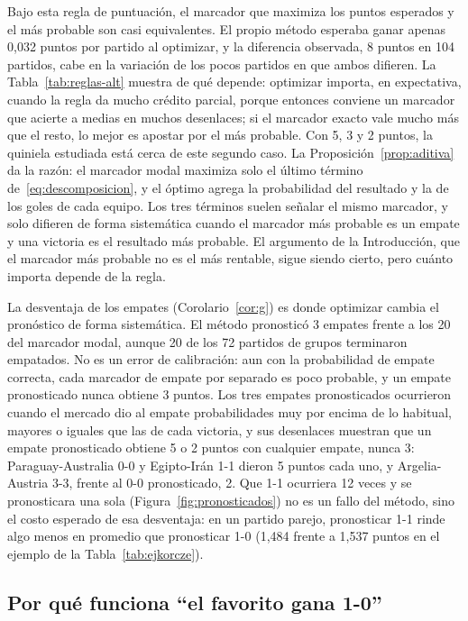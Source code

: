 \documentclass[12pt]{article}
\theoremstyle{plain}
\theoremstyle{remark}
\begin{document}
Bajo esta regla de puntuación, el marcador que maximiza los puntos
esperados y el más probable son casi equivalentes.
El propio método esperaba ganar apenas 0,032 puntos por partido al
optimizar, y la diferencia observada, 8 puntos en 104 partidos, cabe
en la variación de los pocos partidos en que ambos difieren.
La Tabla~\ref{tab:reglas-alt} muestra de qué depende: optimizar
importa, en expectativa, cuando la regla da mucho crédito parcial,
porque entonces conviene un marcador que acierte a medias en muchos
desenlaces; si el marcador exacto vale mucho más que el resto, lo
mejor es apostar por el más probable.
Con 5, 3 y 2 puntos, la quiniela estudiada está cerca de este segundo
caso.
La Proposición~\ref{prop:aditiva} da la razón: el marcador modal
maximiza solo el último término de~\eqref{eq:descomposicion}, y el
óptimo agrega la probabilidad del resultado y la de los goles de cada
equipo.
Los tres términos suelen señalar el mismo marcador, y solo difieren
de forma sistemática cuando el marcador más probable es un empate y
una victoria es el resultado más probable.
El argumento de la Introducción, que el marcador más probable no es
el más rentable, sigue siendo cierto, pero cuánto importa depende de
la regla.

La desventaja de los empates (Corolario~\ref{cor:g}) es donde
optimizar cambia el pronóstico de forma sistemática.
El método pronosticó 3 empates frente a los 20 del marcador modal,
aunque 20 de los 72 partidos de grupos terminaron empatados.
No es un error de calibración: aun con la probabilidad de empate
correcta, cada marcador de empate por separado es poco probable, y un
empate pronosticado nunca obtiene 3 puntos.
Los tres empates pronosticados ocurrieron cuando el mercado dio al
empate probabilidades muy por encima de lo habitual, mayores o iguales
que las de cada victoria, y sus desenlaces muestran que un empate
pronosticado obtiene 5 o 2 puntos con cualquier empate, nunca 3:
Paraguay-Australia 0-0 y Egipto-Irán 1-1 dieron 5 puntos cada uno, y
Argelia-Austria 3-3, frente al 0-0 pronosticado, 2.
Que 1-1 ocurriera 12 veces y se pronosticara una sola
(Figura~\ref{fig:pronosticados}) no es un fallo del método, sino el
costo esperado de esa desventaja: en un partido parejo, pronosticar
1-1 rinde algo menos en promedio que pronosticar 1-0 (1,484 frente a
1,537 puntos en el ejemplo de la Tabla~\ref{tab:ejkorcze}).

\subsection{Por qué funciona ``el favorito gana 1-0''}
\end{document}
